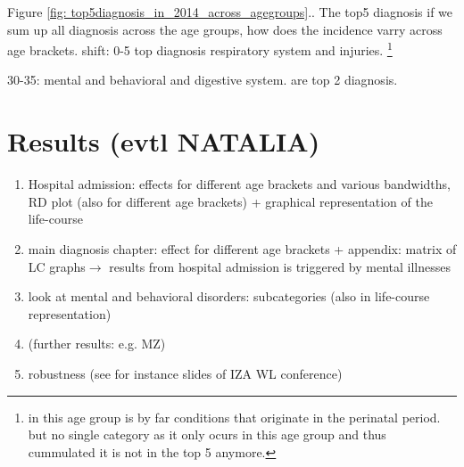 \documentclass[11pt, a4paper,draft]{article} %
\begin{document}
Figure \ref{fig: top5diagnosis_in_2014_across_agegroups}..
The top5 diagnosis if we sum up all diagnosis across the age groups, how does the incidence varry across age brackets.
shift: 
0-5 top diagnosis respiratory system and injuries. \footnote{ in this age group is by far conditions that originate in the perinatal period. but no single category as it only ocurs in this age group and thus cummulated it is not in the top 5 anymore. }

30-35: mental and behavioral and digestive system. are top 2 diagnosis.




\section{Results (evtl NATALIA)}\label{sec:results}

\begin{enumerate}
	\item Hospital admission: effects for different age brackets and various bandwidths, RD plot (also for different age brackets) + graphical representation of the life-course
	\item main diagnosis chapter: effect for different age brackets + appendix: matrix of LC graphs\newline $\rightarrow$ results from hospital admission is triggered by mental illnesses
	\item look at mental and behavioral disorders: subcategories (also in life-course representation) 
	\item (further results: e.g. MZ)
	\item robustness (see for instance slides of IZA WL conference)
\end{enumerate}



\end{document}

